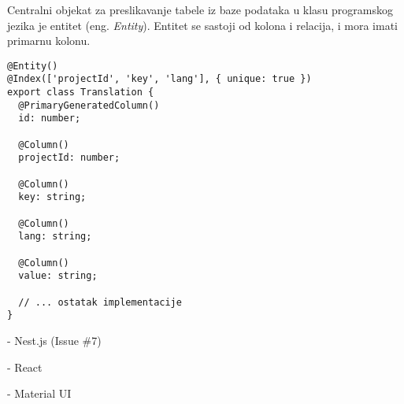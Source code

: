 Centralni objekat za preslikavanje tabele iz baze podataka u klasu programskog jezika je entitet (eng. \textit{Entity}).
Entitet se sastoji od kolona i relacija, i mora imati primarnu kolonu.

\begin{verbatim}
@Entity()
@Index(['projectId', 'key', 'lang'], { unique: true })
export class Translation {
  @PrimaryGeneratedColumn()
  id: number;

  @Column()
  projectId: number;

  @Column()
  key: string;

  @Column()
  lang: string;

  @Column()
  value: string;

  // ... ostatak implementacije
}
\end{verbatim}


- Nest.js (Issue \#7)

- React

- Material UI
